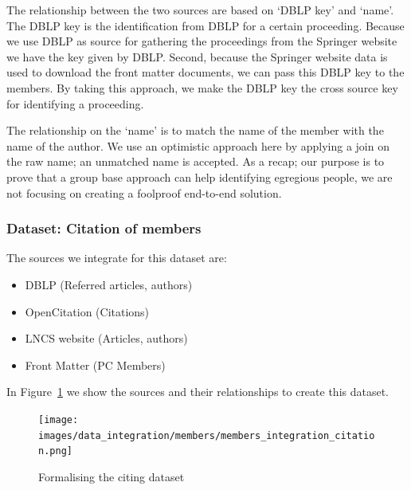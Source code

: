 \documentclass{ou-report}
\newcommand{\lncs}{LNCS}
\newcommand{\dblp}{DBLP}
\begin{document}
The relationship between the two sources are based on `\dblp{} key' and `name'. 
The \dblp{} key is the identification from \dblp{} for a certain proceeding.
Because we use \dblp{} as source for gathering the proceedings from the Springer
website we have the key given by \dblp{}. Second, because the Springer website
data is used to download the front matter documents, we can pass this \dblp{}
key to the members.
By taking this approach, we make the \dblp{} key the cross source key for 
identifying a proceeding.

The relationship on the `name' is to match the name of the member with the name
of the author. We use an optimistic approach here by applying a join on the raw 
name; an unmatched name is accepted. As a recap; our purpose is to prove
that a group base approach can help identifying egregious people, we are not 
focusing on creating a foolproof end-to-end solution.

\subsubsection{Dataset: Citation of members}

The sources we integrate for this dataset are:
\begin{itemize}
    \item \dblp{} (Referred articles, authors)
    \item OpenCitation (Citations)
    \item \lncs{} website (Articles, authors)
    \item Front Matter (PC Members)
\end{itemize}

In Figure~\ref{fig:members_integration_citation} we show the sources and their 
relationships to create this dataset.
\begin{figure}[H]
    \centering
    \texttt{[image: images/data\_integration/members/members\_integration\_citation.png]}
    \caption{Formalising the citing dataset}
    \label{fig:members_integration_citation}
\end{figure}
\end{document}

